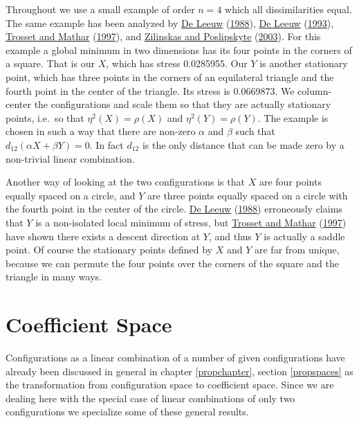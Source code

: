 \documentclass[
  12pt,
]{book}
\theoremstyle{definition}
\theoremstyle{definition}
\theoremstyle{definition}
\theoremstyle{definition}
\theoremstyle{remark}
\begin{document}
Throughout we use a small example of order \(n=4\) which all
dissimilarities equal. The same example has been analyzed by
\protect\hyperlink{ref-deleeuw_A_88b}{De Leeuw} (\protect\hyperlink{ref-deleeuw_A_88b}{1988}), \protect\hyperlink{ref-deleeuw_R_93c}{De Leeuw} (\protect\hyperlink{ref-deleeuw_R_93c}{1993}), \protect\hyperlink{ref-trosset_mathar_97}{Trosset and Mathar} (\protect\hyperlink{ref-trosset_mathar_97}{1997}), and
\protect\hyperlink{ref-zilinskas_podlipskyte_03}{Zilinskas and Poslipskyte} (\protect\hyperlink{ref-zilinskas_podlipskyte_03}{2003}). For this example a global minimum in two
dimensions has its four points in the corners of a square. That is our
\(X\), which has stress 0.0285955. Our \(Y\) is another stationary point, which
has three points in the corners of an equilateral triangle and the
fourth point in the center of the triangle. Its stress is 0.0669873. We
column-center the configurations and scale them so that they are
actually stationary points, i.e.~so that \(\eta^2(X)=\rho(X)\) and
\(\eta^2(Y)=\rho(Y)\). The example is chosen in such a way that there are non-zero \(\alpha\) and \(\beta\) such that \(d_{12}(\alpha X+\beta Y)=0\). In fact \(d_{12}\) is the only distance that can be made zero by a non-trivial linear combination.

Another way of looking at the two configurations is that \(X\) are four
points equally spaced on a circle, and \(Y\) are three points equally
spaced on a circle with the fourth point in the center of the circle.
\protect\hyperlink{ref-deleeuw_A_88b}{De Leeuw} (\protect\hyperlink{ref-deleeuw_A_88b}{1988}) erroneously claims that \(Y\) is a non-isolated local
minimum of stress, but \protect\hyperlink{ref-trosset_mathar_97}{Trosset and Mathar} (\protect\hyperlink{ref-trosset_mathar_97}{1997}) have shown there exists a
descent direction at \(Y\), and thus \(Y\) is actually a saddle point. Of
course the stationary points defined by \(X\) and \(Y\) are far from unique,
because we can permute the four points over the corners of the square
and the triangle in many ways.

\hypertarget{coefficient-space}{%
\section{Coefficient Space}\label{coefficient-space}}

Configurations as a linear combination of a number of given
configurations have already been discussed in general in chapter
\ref{propchapter}, section \ref{propspaces} as the transformation from
configuration space to coefficient space. Since we are dealing here with
the special case of linear combinations of only two configurations we
specialize some of these general results.
\end{document}
